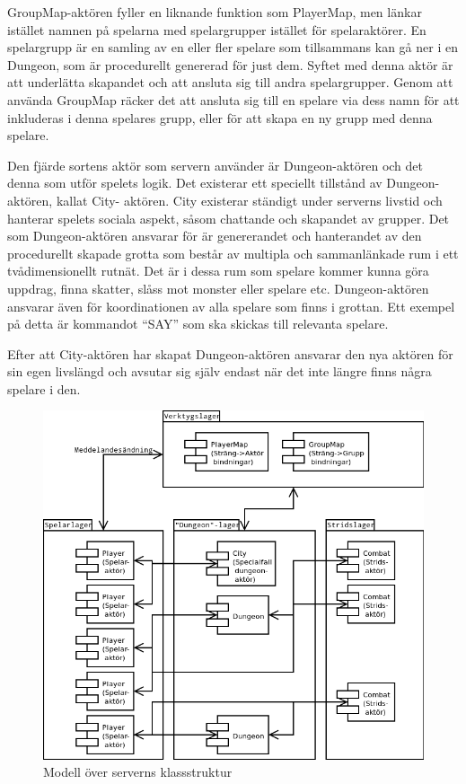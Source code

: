 \documentclass[a4paper]{article}
\begin{document}
GroupMap-aktören fyller en liknande funktion som PlayerMap, men länkar istället namnen på spelarna med spelargrupper istället för spelaraktörer. 
En spelargrupp är en samling av en eller fler spelare som tillsammans kan gå ner i en Dungeon, som är procedurellt genererad för just dem. Syftet med 
denna aktör är att underlätta skapandet och att ansluta sig till andra spelargrupper. Genom att använda GroupMap räcker det att ansluta sig till en 
spelare via dess namn för att inkluderas i denna spelares grupp, eller för att skapa en ny grupp med denna spelare.

Den fjärde sortens aktör som servern använder är Dungeon-aktören och det denna som utför spelets logik. 
Det existerar ett speciellt tillstånd av Dungeon-aktören, kallat City- aktören. City existerar ständigt 
under serverns livstid och hanterar spelets sociala aspekt, såsom chattande och skapandet av grupper. 
Det som Dungeon-aktören ansvarar för är genererandet och hanterandet av den procedurellt skapade 
grotta som består av multipla och sammanlänkade rum i ett tvådimensionellt rutnät. Det är i dessa rum som spelare kommer kunna göra uppdrag, 
finna skatter, slåss mot monster eller spelare etc. Dungeon-aktören ansvarar även för koordinationen av alla spelare som finns i grottan. 
Ett exempel på detta är kommandot “SAY”  som ska skickas till relevanta spelare. 

Efter att City-aktören har skapat Dungeon-aktören ansvarar den nya aktören för sin egen livslängd och avsutar sig själv endast när det inte längre finns några spelare i den.

\begin{figure}[hbt]
\centering
\includegraphics[width=1.0\textwidth]{serverActorModel2-2}
\caption{\label{fig:ServerKlassModell}Modell över serverns klassstruktur}
\end{figure}
\end{document}
